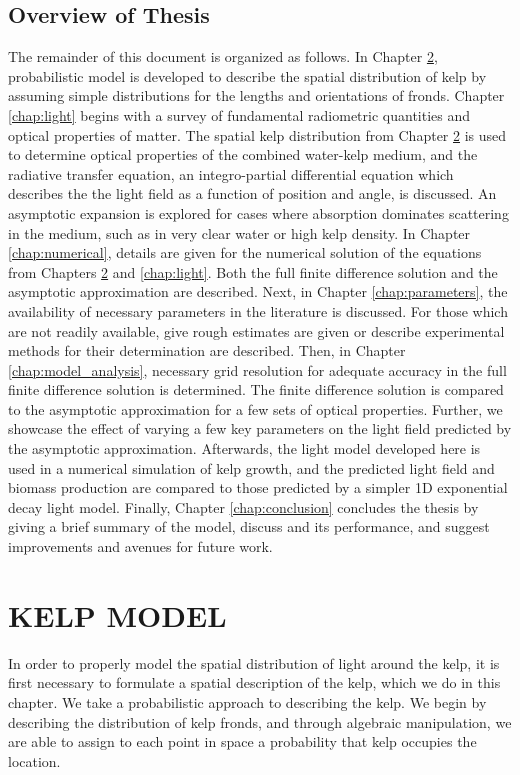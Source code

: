 \documentclass[ms,cpyr,lof,lot]{uathesis}
\begin{document}
\section{Overview of Thesis}
The remainder of this document is organized as follows.
In Chapter \ref{chap:kelp}, probabilistic model is developed to describe the spatial distribution of kelp by assuming simple distributions for the lengths and orientations of fronds.
Chapter \ref{chap:light} begins with a survey of fundamental radiometric quantities and optical properties of matter.
The spatial kelp distribution from Chapter \ref{chap:kelp} is used to determine optical properties of the combined water-kelp medium,
and the radiative transfer equation, an integro-partial differential equation which describes the the light field as a function of position and angle, is discussed.
An asymptotic expansion is explored for cases where absorption dominates scattering in the medium, such as in very clear water or high kelp density.
In Chapter \ref{chap:numerical}, details are given for the numerical solution of the equations from Chapters \ref{chap:kelp} and \ref{chap:light}.
Both the full finite difference solution and the asymptotic approximation are described.
Next, in Chapter \ref{chap:parameters}, the availability of necessary parameters in the literature is discussed.
For those which are not readily available, give rough estimates are given or describe experimental methods for their determination are described.
Then, in Chapter \ref{chap:model_analysis}, necessary grid resolution for adequate accuracy in the full finite difference solution is determined.
The finite difference solution is compared to the asymptotic approximation for a few sets of optical properties.
Further, we showcase the effect of varying a few key parameters on the light field predicted by the asymptotic approximation.
Afterwards, the light model developed here is used in a numerical simulation of kelp growth, and the predicted light field and biomass production are compared to those predicted by a simpler 1D exponential decay light model.
Finally, Chapter \ref{chap:conclusion} concludes the thesis by giving a brief summary of the model, discuss and its performance, and suggest improvements and avenues for future work.
 \chapter{KELP MODEL}
\label{chap:kelp}

In order to properly model the spatial distribution of light around the kelp, it is first necessary to formulate a spatial description of the kelp, which we do in this chapter.
We take a probabilistic approach to describing the kelp.
We begin by describing the distribution of kelp fronds, and through algebraic manipulation, we are able to assign to each point in space a probability that kelp occupies the location.
\end{document}
